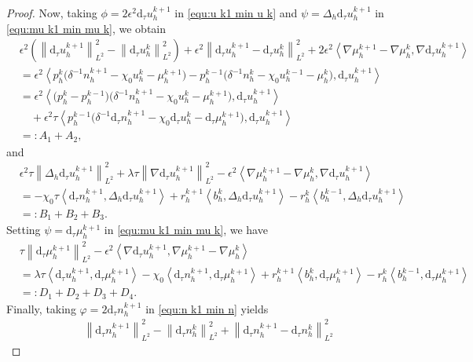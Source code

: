 \documentclass[11pt, reqno]{amsart}
\theoremstyle{definition}
\numberwithin{equation}{section}
\newcommand{\dtt}{\mathrm{d}_\tau}
\newcommand{\norm}[2]{\left\|{#1}\right\|_{#2}}
\newcommand{\inpro}[2]{\left\langle#1,#2\right\rangle}
\begin{document}
\begin{proof}
Now, taking $\phi=2\epsilon^2 \dtt u_h^{k+1}$ in \eqref{equ:u k1 min u k} and $\psi=\Delta_h \dtt u_h^{k+1}$ in \eqref{equ:mu k1 min mu k}, we obtain
\begin{align}\label{equ:dt min dt}
	&\epsilon^2 \left(\norm{\dtt u_h^{k+1}}{L^2}^2 - \norm{\dtt u_h^k}{L^2}^2 \right)
	+
	\epsilon^2 \norm{\dtt u_h^{k+1}-\dtt u_h^k}{L^2}^2
	+
	2\epsilon^2 \inpro{\nabla \mu_h^{k+1}-\nabla \mu_h^k}{\nabla \dtt u_h^{k+1}}
	\nonumber\\
	&=
	\epsilon^2 \inpro{p_h^k\big(\delta^{-1} n_h^{k+1}-\chi_0 u_h^k - \mu_h^{k+1}\big)- p_h^{k-1} \big(\delta^{-1} n_h^k-\chi_0 u_h^{k-1} - \mu_h^k\big)}{\dtt u_h^{k+1}}
	\nonumber\\
	&=
	\epsilon^2 \inpro{\big(p_h^k-p_h^{k-1}\big) \big(\delta^{-1} n_h^{k+1}-\chi_0 u_h^k - \mu_h^{k+1}\big)}{\dtt u_h^{k+1}}
	\nonumber\\
	&\quad
	+
	\epsilon^2 \tau 
	\inpro{p_h^{k-1} \big(\delta^{-1} \dtt n_h^{k+1}- \chi_0 \dtt u_h^k - \dtt \mu_h^{k+1} \big)}{\dtt u_h^{k+1}}
	\nonumber\\
	&=: A_1+A_2,
\end{align}
and
\begin{align}\label{equ:nab mu min nab mu}
	&\epsilon^2 \tau \norm{\Delta_h \dtt u_h^{k+1}}{L^2}^2 
	+
	\lambda \tau \norm{\nabla \dtt u_h^{k+1}}{L^2}^2
	-
	\epsilon^2
	\inpro{\nabla \mu_h^{k+1}-\nabla \mu_h^k}{\nabla \dtt u_h^{k+1}}
	\nonumber\\
	&=
	-\chi_0 \tau \inpro{\dtt n_h^{k+1}}{\Delta_h \dtt u_h^{k+1}}
	+
	r_h^{k+1} \inpro{b_h^k}{\Delta_h \dtt u_h^{k+1}}
	-
	r_h^k \inpro{b_h^{k-1}}{\Delta_h \dtt u_h^{k+1}}
	\nonumber\\
	&=: B_1+B_2+B_3.
\end{align}
Setting $\psi=\dtt \mu_h^{k+1}$ in \eqref{equ:mu k1 min mu k}, we have
\begin{align}\label{equ:mu min mu}
	&\tau \norm{\dtt \mu_h^{k+1}}{L^2}^2
	-
	\epsilon^2 \inpro{\nabla \dtt u_h^{k+1}}{\nabla \mu_h^{k+1} -\nabla\mu_h^k}
	\nonumber\\
	&=
	\lambda \tau \inpro{\dtt u_h^{k+1}}{\dtt \mu_h^{k+1}}
	-
	\chi_0 \inpro{\dtt n_h^{k+1}}{\dtt \mu_h^{k+1}}
	+
	r_h^{k+1} \inpro{b_h^k}{\dtt \mu_h^{k+1}}
	-
	r_h^k \inpro{b_h^{k-1}}{\dtt \mu_h^{k+1}}
	\nonumber\\
	&=:D_1+D_2+D_3+D_4.
\end{align}
Finally, taking $\varphi=2\dtt n_h^{k+1}$ in \eqref{equ:n k1 min n} yields
\begin{align}\label{equ:dtn min dtn}
	&\norm{\dtt n_h^{k+1}}{L^2}^2 - \norm{\dtt n_h^k}{L^2}^2 + \norm{\dtt n_h^{k+1}-\dtt n_h^k}{L^2}^2

\end{align}
\end{proof}
\end{document}
